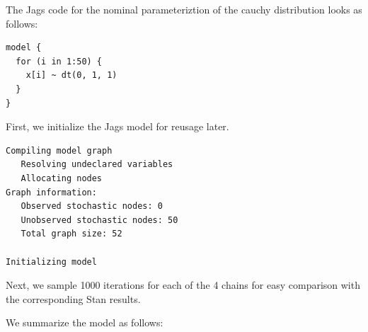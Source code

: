\documentclass[american,]{article}
\begin{document}
The Jags code for the nominal parameteriztion of the cauchy distribution
looks as follows:

\begin{verbatim}
model {
  for (i in 1:50) {
    x[i] ~ dt(0, 1, 1)
  }
}
\end{verbatim}

First, we initialize the Jags model for reusage later.

\begin{verbatim}
Compiling model graph
   Resolving undeclared variables
   Allocating nodes
Graph information:
   Observed stochastic nodes: 0
   Unobserved stochastic nodes: 50
   Total graph size: 52

Initializing model
\end{verbatim}

Next, we sample 1000 iterations for each of the 4 chains for easy
comparison with the corresponding Stan results.

We summarize the model as follows:
\end{document}
